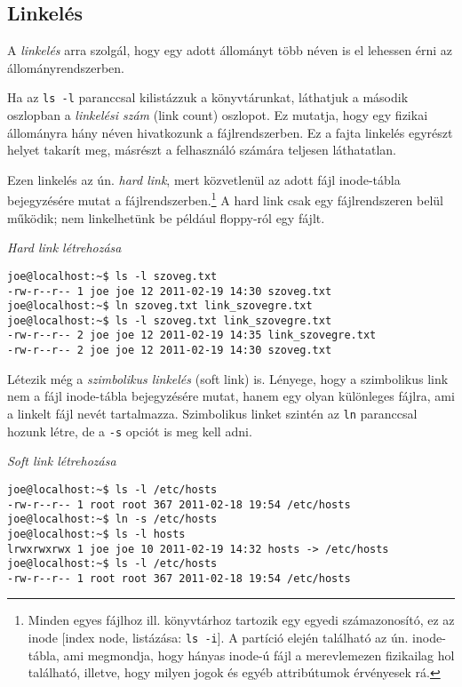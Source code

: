 \subsection{Linkelés} 

A \emph{linkelés} arra szolgál, hogy egy adott állományt több néven is el lehessen érni az állományrendszerben. 



Ha az \verb.ls -l. paranccsal kilistázzuk a könyvtárunkat, láthatjuk a második oszlopban a \emph{linkelési szám} (link count) oszlopot. Ez mutatja, hogy egy fizikai állományra hány néven hivatkozunk a fájlrendszerben. Ez a fajta linkelés egyrészt helyet takarít meg, másrészt a %
felhasználó számára teljesen láthatatlan. 

Ezen linkelés az ún. \emph{hard link}, mert közvetlenül az adott fájl inode-tábla bejegyzésére mutat a fájlrendszerben.\footnote{Minden egyes fájlhoz ill. könyvtárhoz tartozik egy egyedi számazonosító, ez az inode [index node, listázása: \texttt{ls -i}]. A partíció elején található az ún. inode-tábla, ami megmondja, hogy hányas inode-ú fájl a merevlemezen fizikailag hol található, illetve, hogy milyen jogok és egyéb attribútumok érvényesek rá.} A hard link csak egy fájlrendszeren belül működik; nem linkelhetünk be például floppy-ról egy fájlt.
\medskip

\emph{Hard link létrehozása}
\begin{lstlisting}
joe@localhost:~$ ls -l szoveg.txt 
-rw-r--r-- 1 joe joe 12 2011-02-19 14:30 szoveg.txt
joe@localhost:~$ ln szoveg.txt link_szovegre.txt
joe@localhost:~$ ls -l szoveg.txt link_szovegre.txt 
-rw-r--r-- 2 joe joe 12 2011-02-19 14:35 link_szovegre.txt
-rw-r--r-- 2 joe joe 12 2011-02-19 14:30 szoveg.txt
\end{lstlisting}


Létezik még a \emph{szimbolikus linkelés} (soft link) is. Lényege, hogy a szimbolikus link nem a fájl inode-tábla bejegyzésére mutat, hanem egy olyan különleges fájlra, ami a linkelt fájl nevét tartalmazza. Szimbolikus linket szintén az \verb.ln. paranccsal hozunk létre, de a \verb.-s. opciót is meg kell adni. 
\medskip

\emph{Soft link létrehozása}
\begin{lstlisting}
joe@localhost:~$ ls -l /etc/hosts
-rw-r--r-- 1 root root 367 2011-02-18 19:54 /etc/hosts
joe@localhost:~$ ln -s /etc/hosts
joe@localhost:~$ ls -l hosts
lrwxrwxrwx 1 joe joe 10 2011-02-19 14:32 hosts -> /etc/hosts
joe@localhost:~$ ls -l /etc/hosts
-rw-r--r-- 1 root root 367 2011-02-18 19:54 /etc/hosts
\end{lstlisting}

